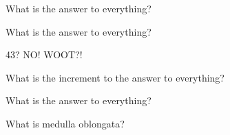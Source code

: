 \documentclass[12pt]{article}
\begin{document}
\begin{myexercise}
    What is the answer to everything?
\end{myexercise}

\begin{myexercise}
    What is the answer to everything?
\end{myexercise}
43?
NO!
WOOT?!

\begin{myexercise}[newpage]
    What is the increment to the answer to everything?
\end{myexercise}

\begin{myexercise}
    What is the answer to everything?
\end{myexercise}

What is medulla oblongata?
\end{document}
